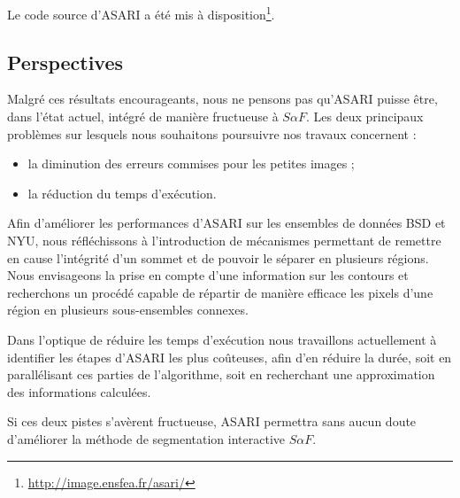 Le code source d'ASARI a été mis à disposition\footnote{\url{http://image.ensfea.fr/asari/}}.

\subsection{Perspectives}
Malgré ces résultats encourageants, nous ne pensons pas qu'ASARI puisse être, dans l'état actuel, intégré de manière fructueuse à $S \alpha F$. Les deux principaux problèmes sur lesquels nous souhaitons poursuivre nos travaux concernent :
\begin{itemize}
\item la diminution des erreurs commises pour les petites images ;
\item la réduction du temps d'exécution. 
\end{itemize}

Afin d'améliorer les performances d'ASARI sur les ensembles de données BSD et NYU, nous réfléchissons à l'introduction de mécanismes permettant de remettre en cause l'intégrité d'un sommet et de pouvoir le séparer en plusieurs régions. Nous envisageons la prise en compte d'une information sur les contours et recherchons un procédé capable de répartir de manière efficace les pixels d'une région en plusieurs sous-ensembles connexes.

Dans l'optique de réduire les temps d'exécution\modif{,} nous travaillons actuellement à identifier les étapes d'ASARI les plus coûteuses, afin d'en réduire la durée, soit en parallélisant ces parties de l'algorithme, soit en recherchant une approximation des informations calculées.

Si ces deux pistes s'avèrent fructueuse, ASARI permettra sans aucun doute d'améliorer la méthode de segmentation interactive $S \alpha F$.